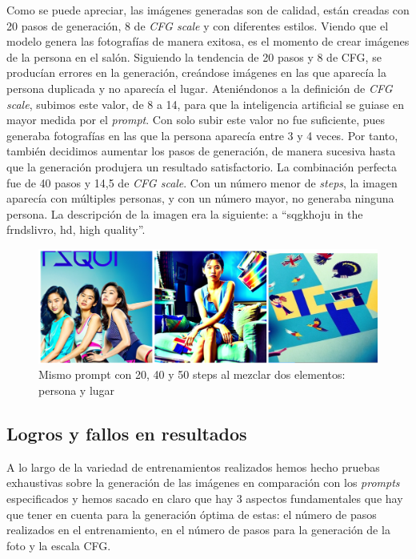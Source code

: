 Como se puede apreciar, las imágenes generadas son de calidad, están creadas con 20 pasos de generación, 8 de \textit{CFG scale} y con diferentes estilos. Viendo que el modelo genera las fotografías de manera exitosa, es el momento de crear imágenes de la persona en el salón. Siguiendo la tendencia de 20 pasos y 8 de CFG, se producían errores en la generación, creándose imágenes en las que aparecía la persona duplicada y no aparecía el lugar. Ateniéndonos a la definición de \textit{CFG scale}, subimos este valor, de 8 a 14, para que la inteligencia artificial se guiase en mayor medida por el \textit{prompt}. Con solo subir este valor no fue suficiente, pues generaba fotografías en las que la persona aparecía entre 3 y 4 veces. Por tanto, también decidimos aumentar los pasos de generación, de manera sucesiva hasta que la generación produjera un resultado satisfactorio. La combinación perfecta fue de 40 pasos y 14,5 de \textit{CFG scale}. Con un número menor de \textit{steps}, la imagen aparecía con múltiples personas, y con un número mayor, no generaba ninguna persona. La descripción de la imagen era la siguiente: a ``sqgkhoju in the frndslivro, hd, high quality''.\\

\begin{figure}[!htb]
	\centering
	\includegraphics[width = 1
	\textwidth]{Imagenes/Vectorial/resultadoshojuyfrnds.png}
	\caption{Mismo prompt con 20, 40 y 50 steps al mezclar dos elementos: persona y lugar}
	\label{fig:comphachi}
\end{figure}


\subsection{Logros y fallos en resultados}

A lo largo de la variedad de entrenamientos realizados hemos hecho pruebas exhaustivas sobre la generación de las imágenes en comparación con los \textit{prompts} especificados y hemos sacado en claro que hay 3 aspectos fundamentales que hay que tener en cuenta para la generación óptima de estas: el número de pasos realizados en el entrenamiento, en el número de pasos para la generación de la foto y la escala CFG. 


